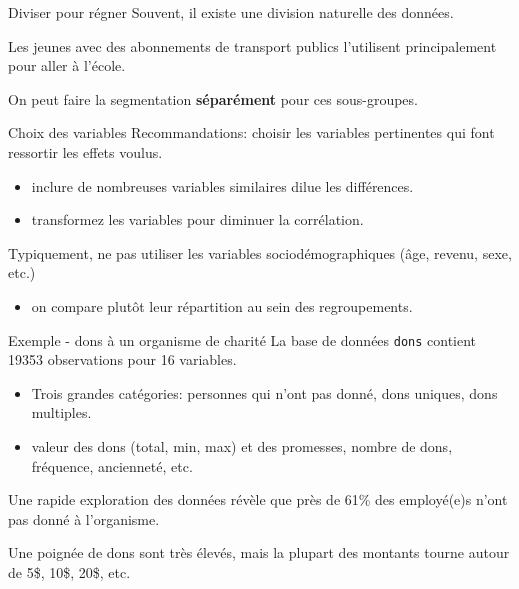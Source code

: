 \documentclass[
  ignorenonframetext,
]{beamer}
\providecommand{\tightlist}{%
  \setlength{\itemsep}{0pt}\setlength{\parskip}{0pt}}\usepackage{longtable,booktabs,array}
\begin{document}
\begin{frame}{Diviser pour régner}
\protect\hypertarget{diviser-pour-ruxe9gner}{}
Souvent, il existe une division naturelle des données.

Les jeunes avec des abonnements de transport publics l'utilisent
principalement pour aller à l'école.

On peut faire la segmentation \textbf{séparément} pour ces sous-groupes.
\end{frame}

\begin{frame}{Choix des variables}
\protect\hypertarget{choix-des-variables}{}
Recommandations: choisir les variables pertinentes qui font ressortir
les effets voulus.

\begin{itemize}
\tightlist
\item
  inclure de nombreuses variables similaires dilue les différences.
\item
  transformez les variables pour diminuer la corrélation.
\end{itemize}

Typiquement, ne pas utiliser les variables sociodémographiques (âge,
revenu, sexe, etc.)

\begin{itemize}
\tightlist
\item
  on compare plutôt leur répartition au sein des regroupements.
\end{itemize}
\end{frame}

\begin{frame}[fragile]{Exemple - dons à un organisme de charité}
\protect\hypertarget{exemple---dons-uxe0-un-organisme-de-charituxe9}{}
La base de données \texttt{dons} contient 19353 observations pour 16
variables.

\begin{itemize}
\tightlist
\item
  Trois grandes catégories: personnes qui n'ont pas donné, dons uniques,
  dons multiples.
\item
  valeur des dons (total, min, max) et des promesses, nombre de dons,
  fréquence, ancienneté, etc.
\end{itemize}

Une rapide exploration des données révèle que près de 61\% des
employé(e)s n'ont pas donné à l'organisme.

Une poignée de dons sont très élevés, mais la plupart des montants
tourne autour de 5\$, 10\$, 20\$, etc.
\end{frame}
\end{document}
